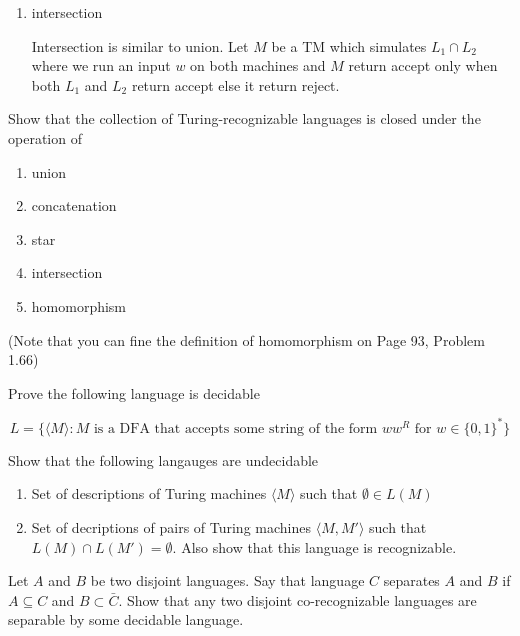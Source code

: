 \documentclass[12pt]{exam}
\begin{document}
\begin{questions}
\begin{solution}
\begin{enumerate}
      \item intersection

            Intersection is similar to union. Let $M$ be a TM which simulates $L_{1}\cap L_{2}$  where we run an input $w$ on both machines and $M$ return accept only when both $L_{1}$ and $L_{2}$ return accept else it return reject.

    \end{enumerate}

  \end{solution}
  \question{}
  Show that the collection of Turing-recognizable languages is closed under the operation of

  \begin{multicols}{2}
  \begin{enumerate}
    \item union
    \item concatenation
    \item star
    \item intersection
    \item homomorphism
  \end{enumerate}
  \end{multicols}

  (Note that you can fine the definition of homomorphism on Page 93, Problem 1.66)


  \question{}
  Prove the following language is decidable

  \[L=\{\langle M \rangle :M\text{ is a DFA that accepts some string of the form } ww^{R} \text{ for } w\in \{0,1\}^{*}\}\]


  \question{}
  Show that the following langauges are undecidable

  \begin{enumerate}
    \item Set of descriptions of Turing machines $\langle M \rangle$ such that $\emptyset \in L(M)$

    \item Set of decriptions of pairs of Turing machines $\langle M, M' \rangle$ such that $L(M)\cap L(M') = \emptyset$.
          Also show that this language is recognizable.

  \end{enumerate}


  \question{}
  Let $A$ and $B$ be two disjoint languages. Say that language $C$ separates $A$ and $B$ if $A\subseteq C$ and $B\subset \bar C$. Show that any two disjoint co-recognizable languages are separable by some decidable language.



\end{questions}
\end{document}
